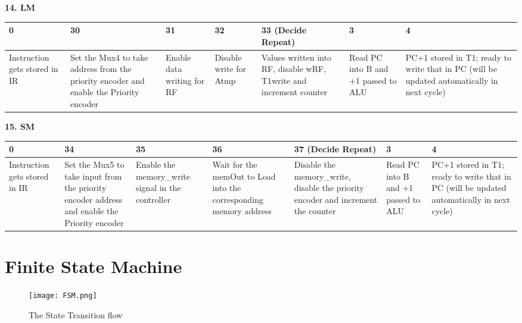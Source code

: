 \documentclass[11pt,fleqn,oneside]{book} %
\begin{document}
\newpage 
\textbf{14. LM }
\begin{center}
 \begin{tabular}{ | m{5em} | m{5em} | m{5em} | m{5em} | m{5em} | m{5em} |  m{7em} |} 
 \hline
 0 & 30 & 31 & 32 & 33 (Decide Repeat) & 3 & 4 \\ [0.5ex]
 \hline
 Instruction gets stored in IR & Set the Mux4 to take address from the priority encoder and enable the Priority encoder & Enable data writing for RF & Disable write for Atmp & Values written into RF, disable wRF, T1write and increment counter & Read PC into B and +1 passed to ALU  & PC+1 stored in T1; ready to write that in PC (will be updated automatically in next cycle)\\ [1ex] 
 \hline
\end{tabular}
\end{center}

\vspace{0.5cm}

\textbf{15. SM }
\begin{center}
 \begin{tabular}{ | m{5em} | m{5em} | m{5em} | m{5em} | m{7em} | m{5em} |  m{7em} |} 
 \hline
 0 & 34 & 35 & 36 & 37 (Decide Repeat) & 3 & 4 \\ [0.5ex]
 \hline
 Instruction gets stored in IR & Set the Mux5 to take input from the priority encoder address and enable the Priority encoder & Enable the memory\_write signal in the controller & Wait for the memOut to Load into the corresponding memory address & Disable the memory\_write, disable the priority encoder and increment the counter  & Read PC into B and +1 passed to ALU  & PC+1 stored in T1; ready to write that in PC (will be updated automatically in next cycle)\\ [1ex] 
 \hline
\end{tabular}
\end{center}

\newpage

\section{Finite State Machine}

\begin{figure}[h]
    \centering
    \texttt{[image: FSM.png]}
    \caption{The State Transition flow }
    \label{fig:awesome_image}
\end{figure}
\newpage


\end{document}
